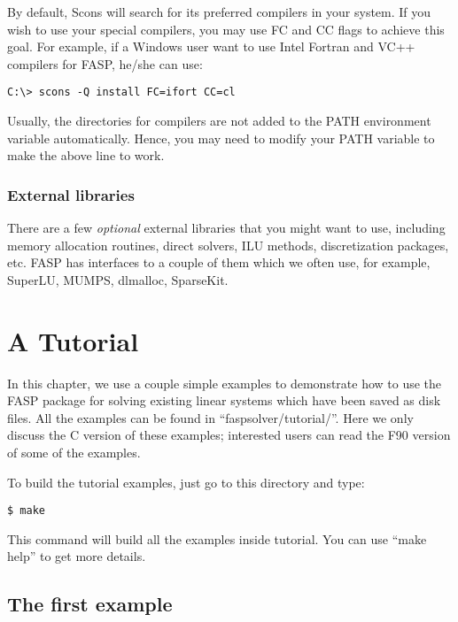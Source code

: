 \documentclass[11pt]{memoir}
\begin{document}
By default, Scons will search for its preferred compilers in your system. If you wish to use your special compilers, you may use FC and CC flags to achieve this goal. For example, if a Windows user want to use Intel Fortran and VC++ compilers for FASP, he/she can use:
\begin{lstlisting}[numbers=none]
C:\> scons -Q install FC=ifort CC=cl
\end{lstlisting}

\begin{snugshade}\noindent
Usually, the directories for compilers are not added to the PATH environment variable automatically. Hence, you may need to modify your PATH variable to make the above line to work. 
\end{snugshade}


\subsection{External libraries}\label{ssec:lib}

There are a few \emph{optional} external libraries that you might want to use, including memory allocation routines, direct solvers, ILU methods, discretization packages, etc. FASP has interfaces to a couple of them which we often use, for example, SuperLU, MUMPS, dlmalloc, SparseKit.


\chapter{A Tutorial}\label{ch:tutor}

In this chapter, we use a couple simple examples to demonstrate how to use the FASP package for solving existing linear systems which have been saved as disk files. All the examples can be found in ``faspsolver/tutorial/''. Here we only discuss the C version of these examples; interested users can read the F90 version of some of the examples.

To build the tutorial examples, just go to this directory and type:
%
\begin{lstlisting}[numbers=none]
$ make
\end{lstlisting}
%
This command will build all the examples inside tutorial. You can use ``make help'' to get more details.


\section{The first example}\label{sec:ex1}
\end{document}
